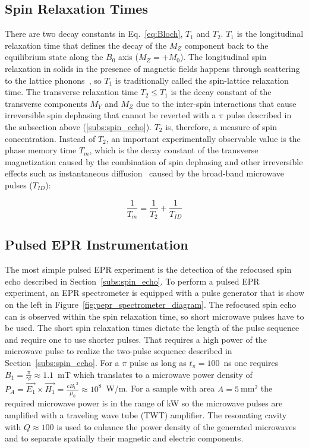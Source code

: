 \subsection{Spin Relaxation Times}
\label{sec:relaxation_times}
There are two decay constants in Eq.~\ref{eq:Bloch}, $T_1$ and $T_2$. $T_1$ is the longitudinal relaxation time that defines the decay of the $M_Z$ component back to the equilibrium state along the $B_0$ axis ($M_Z = +M_0$). The longitudinal spin relaxation in solids in the presence of magnetic fields happens through scattering to the lattice phonons~\cite{Lunghi2019}, so $T_1$ is traditionally called the spin-lattice relaxation time. The transverse relaxation time $T_2\leq T_1$ is the decay constant of the transverse components $M_Y$ and $M_Z$ due to the inter-spin interactions that cause irreversible spin dephasing that cannot be reverted with a $\pi$ pulse described in the subsection above (\ref{subs:spin_echo}). $T_2$ is, therefore, a measure of spin concentration. Instead of $T_2$, an important experimentally observable value is the phase memory time $T_m$, which is the decay constant of the transverse magnetization caused by the combination of spin dephasing and other irreversible effects such as instantaneous diffusion~\cite{Schweiger2001,Daniel2022} caused by the broad-band microwave pulses ($T_{ID}$):

\begin{equation}
\label{eq:Tm}
\frac{1}{T_m} = \frac{1}{T_2} + \frac{1}{T_{ID}}
\end{equation} 


\subsection{Pulsed EPR Instrumentation}
The most simple pulsed EPR experiment is the detection of the refocused spin echo described in Section~\ref{subs:spin_echo}. To perform a pulsed EPR experiment, an EPR spectrometer is equipped with a pulse generator that is show on the left in Figure~\ref{fig:pepr_spectrometer_diagram}. The refocused spin echo can is observed within the spin relaxation time, so short microwave pulses have to be used. The short spin relaxation times dictate the length of the pulse sequence and require one to use shorter pulses. That requires a high power of the microwave pulse to realize the two-pulse sequence described in Section~\ref{subs:spin_echo}. For a $\pi$ pulse as long as $t_{\pi}=100$~ns one requires $B_1=\frac{\pi}{\gamma t}\approx1.1$~mT which translates to a microwave power density of $P_A=\vec{E_1}\times\vec{H_1}=\frac{c{B_1}^2}{\mu_0}\approx10^8$~W/m. For a sample with area $A=5~$mm$^2$ the required microwave power is in the range of kW so the microwave pulses are amplified with a traveling wave tube (TWT) amplifier. The resonating cavity with $Q\approx100$ is used to enhance the power density of the generated microwaves and to separate spatially their magnetic and electric components.

